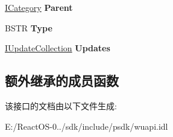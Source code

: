 \begin{DoxyCompactItemize}
\hyperlink{interface_w_u_api_lib_1_1_i_category}{I\+Category} {\bfseries Parent}
\item 
\mbox{\label{interface_w_u_api_lib_1_1_i_category_a7a353f1777f0b6d69ea1c6f203f31001}} 
B\+S\+TR {\bfseries Type}
\item 
\mbox{\label{interface_w_u_api_lib_1_1_i_category_a3f7e44c4131ae694fd37cc7cec286494}} 
\hyperlink{interface_w_u_api_lib_1_1_i_update_collection}{I\+Update\+Collection} {\bfseries Updates}
\end{DoxyCompactItemize}
\subsection*{额外继承的成员函数}


该接口的文档由以下文件生成\+:\begin{DoxyCompactItemize}
\item 
E\+:/\+React\+O\+S-\/0../sdk/include/psdk/wuapi.\+idl\end{DoxyCompactItemize}

